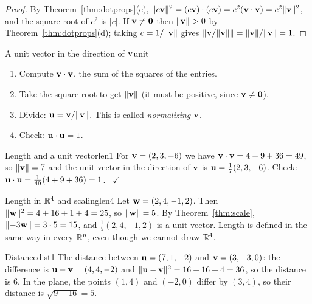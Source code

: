 \documentclass[11pt]{article}
\begin{document}
\begin{proof}
By Theorem~\ref{thm:dotprops}(c), $\lVert c\mathbf{v}\rVert^2=(c\mathbf{v})\cdot(c\mathbf{v})=c^2(\mathbf{v}\cdot\mathbf{v})=c^2\lVert\mathbf{v}\rVert^2$, and the square root of $c^2$ is $|c|$. If $\mathbf{v}\neq\mathbf{0}$ then $\lVert\mathbf{v}\rVert>0$ by Theorem~\ref{thm:dotprops}(d); taking $c=1/\lVert\mathbf{v}\rVert$ gives $\lVert\mathbf{v}/\lVert\mathbf{v}\rVert\rVert=\lVert\mathbf{v}\rVert/\lVert\mathbf{v}\rVert=1$.
\end{proof}

\begin{proc}{A unit vector in the direction of $\mathbf{v}$}{unit}
\begin{enumerate}[nosep]
  \item Compute $\mathbf{v}\cdot\mathbf{v}$, the sum of the squares of the entries.
  \item Take the square root to get $\lVert\mathbf{v}\rVert$ (it must be positive, since $\mathbf{v}\neq\mathbf{0}$).
  \item Divide: $\mathbf{u}=\mathbf{v}/\lVert\mathbf{v}\rVert$. This is called \emph{normalizing} $\mathbf{v}$.
  \item Check: $\mathbf{u}\cdot\mathbf{u}=1$.
\end{enumerate}
\end{proc}

\begin{exmp}{Length and a unit vector}{len1}
For $\mathbf{v}=(2,3,-6)$ we have $\mathbf{v}\cdot\mathbf{v}=4+9+36=49$, so $\lVert\mathbf{v}\rVert=7$ and the unit vector in the direction of $\mathbf{v}$ is $\mathbf{u}=\tfrac17(2,3,-6)$. Check: $\mathbf{u}\cdot\mathbf{u}=\tfrac{1}{49}(4+9+36)=1$. \ $\checkmark$
\end{exmp}

\begin{exmp}{Length in $\mathbb{R}^4$ and scaling}{len4}
Let $\mathbf{w}=(2,4,-1,2)$. Then $\lVert\mathbf{w}\rVert^2=4+16+1+4=25$, so $\lVert\mathbf{w}\rVert=5$. By Theorem~\ref{thm:scale}, $\lVert-3\mathbf{w}\rVert=3\cdot5=15$, and $\tfrac15(2,4,-1,2)$ is a unit vector. Length is defined in the same way in every $\mathbb{R}^n$, even though we cannot draw $\mathbb{R}^4$.
\end{exmp}

\begin{exmp}{Distance}{dist1}
The distance between $\mathbf{u}=(7,1,-2)$ and $\mathbf{v}=(3,-3,0)$: the difference is $\mathbf{u}-\mathbf{v}=(4,4,-2)$ and $\lVert\mathbf{u}-\mathbf{v}\rVert^2=16+16+4=36$, so the distance is $6$. In the plane, the points $(1,4)$ and $(-2,0)$ differ by $(3,4)$, so their distance is $\sqrt{9+16}=5$.
\end{exmp}
\end{document}
